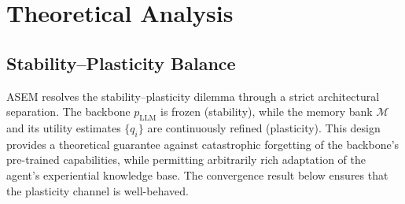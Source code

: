 \documentclass{article}
\newtheorem{theorem}{Theorem}[section]
\newcommand{\memset}{\mathcal{M}}
\newcommand{\note}{m}
\newcommand{\ours}{\textsc{ASEM}\xspace}
\begin{document}
\section{Theoretical Analysis}
\label{sec:theory}

\subsection{Stability--Plasticity Balance}

\ours resolves the stability--plasticity dilemma through a strict architectural
separation.
The backbone $p_{\mathrm{LLM}}$ is frozen (stability), while the memory bank
$\memset$ and its utility estimates $\{q_i\}$ are continuously refined
(plasticity).
This design provides a theoretical guarantee against catastrophic forgetting
of the backbone's pre-trained capabilities, while permitting arbitrarily rich
adaptation of the agent's experiential knowledge base.
The convergence result below ensures that the plasticity channel is
well-behaved.


\end{document}
